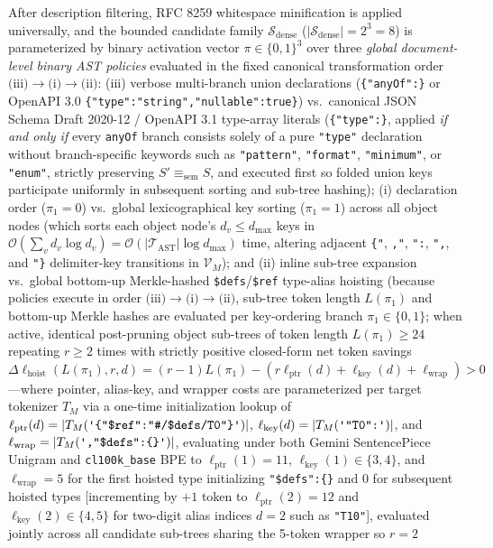 \documentclass[conference,10pt]{IEEEtran}
\begin{document}
After description filtering, RFC 8259 whitespace minification \cite{bray2017rfc8259} is applied universally, and the bounded candidate family $\mathcal{S}_{\text{dense}}$ ($|\mathcal{S}_{\text{dense}}| = 2^3 = 8$) is parameterized by binary activation vector $\pi \in \{0, 1\}^3$ over three \textit{global document-level binary AST policies} evaluated in the fixed canonical transformation order $\text{(iii)} \to \text{(i)} \to \text{(ii)}$: (iii) verbose multi-branch union declarations (\texttt{\{"anyOf":\}} or OpenAPI 3.0 \texttt{\{"type":\allowbreak"string",\allowbreak"nullable":\allowbreak true\}}) vs.\ canonical JSON Schema Draft 2020-12 / OpenAPI 3.1 type-array literals (\texttt{\{"type":\}}, applied \emph{if and only if} every \texttt{anyOf} branch consists solely of a pure \texttt{"type"} declaration without branch-specific keywords such as \texttt{"pattern"}, \texttt{"format"}, \texttt{"minimum"}, or \texttt{"enum"}, strictly preserving $S' \equiv_{\text{sem}} S$, and executed first so folded union keys participate uniformly in subsequent sorting and sub-tree hashing); (i) declaration order ($\pi_1=0$) vs.\ global lexicographical key sorting ($\pi_1=1$) across all object nodes (which sorts each object node's $d_v \le d_{\max}$ keys in $\mathcal{O}(\sum_v d_v \log d_v) = \mathcal{O}(|\mathcal{T}_{\text{AST}}| \log d_{\max})$ time, altering adjacent \texttt{\textquotesingle\{"\textquotesingle}, \texttt{\textquotesingle,"\textquotesingle}, \texttt{\textquotesingle":\textquotesingle}, \texttt{\textquotesingle",\textquotesingle}, and \texttt{\textquotesingle"\}\textquotesingle} delimiter-key transitions in $\mathcal{V}_M$); and (ii) inline sub-tree expansion vs.\ global bottom-up Merkle-hashed \texttt{\$defs}/\texttt{\$ref} type-alias hoisting (because policies execute in order $\text{(iii)} \to \text{(i)} \to \text{(ii)}$, sub-tree token length $L(\pi_1)$ and bottom-up Merkle hashes are evaluated per key-ordering branch $\pi_1 \in \{0, 1\}$; when active, identical post-pruning object sub-trees of token length $L(\pi_1) \ge 24$ repeating $r \ge 2$ times with strictly positive closed-form net token savings $\Delta\ell_{\text{hoist}}(L(\pi_1), r, d) = (r - 1)L(\pi_1) - (r\ell_{\text{ptr}}(d) + \ell_{\text{key}}(d) + \ell_{\text{wrap}}) > 0$---where pointer, alias-key, and wrapper costs are parameterized per target tokenizer $T_M$ via a one-time initialization lookup of $\ell_{\text{ptr}}(d) = |T_M(\texttt{\textquotesingle\{"\$ref":"\#/\$defs/T0"\}\textquotesingle})|$, $\ell_{\text{key}}(d) = |T_M(\texttt{\textquotesingle"T0":\textquotesingle})|$, and $\ell_{\text{wrap}} = |T_M(\texttt{\textquotesingle,"\$defs":\{\}\textquotesingle})|$, evaluating under both Gemini SentencePiece Unigram and \texttt{cl100k\_base} BPE to $\ell_{\text{ptr}}(1) = 11$, $\ell_{\text{key}}(1) \in \{3, 4\}$, and $\ell_{\text{wrap}} = 5$ for the first hoisted type initializing \texttt{"\$defs":\{\}} and $0$ for subsequent hoisted types [incrementing by $+1$ token to $\ell_{\text{ptr}}(2) = 12$ and $\ell_{\text{key}}(2) \in \{4, 5\}$ for two-digit alias indices $d = 2$ such as \texttt{"T10"}], evaluated jointly across all candidate sub-trees sharing the 5-token wrapper so $r=2$ 
\end{document}
